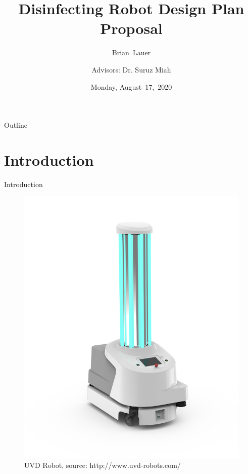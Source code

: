 \documentclass{beamer}
\title[Design Proposal]{Disinfecting Robot Design Plan Proposal}
\author[B.~Lauer]{Brian~Lauer\\\and
Advisors: Dr. Suruz Miah}
\institute[Bradley University] %
{
  Department of Electrical and Computer Engineering\\
  Bradley University\\
  1501 W. Bradley Avenue\\
  Peoria, IL, 61625, USA
}
\date[August~17,~2020]{Monday, August~17,~2020}
\begin{document}
\begin{frame}
  \titlepage
\end{frame}

\begin{frame}{Outline}
  \tableofcontents
\end{frame}

\section{Introduction}
\begin{frame}{Introduction}{}
\begin{figure}
	\centering
	\includegraphics[scale=0.2]{figs/img/UVDR-front}
	\caption{UVD Robot, source: http://www.uvd-robots.com/}
\end{figure}
\end{frame}
\end{document}
